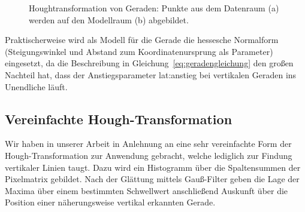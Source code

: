 \begin{figure}[h] %
  \centering  
  \qquad
  \caption{Houghtransformation von Geraden: Punkte aus dem Datenraum (a) werden auf den Modellraum (b) abgebildet.}
\end{figure} 

Praktischerweise wird als Modell für die Gerade die hessesche Normalform (Steigungswinkel und Abstand zum Koordinatenursprung als Parameter) eingesetzt, da die Beschreibung in Gleichung~\ref{eq:geradengleichung} den großen Nachteil hat, dass der Anstiegsparameter \gls{lat:anstieg} bei vertikalen Geraden ins Unendliche läuft. 

\subsection{Vereinfachte Hough-Transformation}
\label{ssec:grundlagen:hough:vereinfachte}
Wir haben in unserer Arbeit in Anlehnung an \autocite{alyRealTimeDetection2008} eine sehr vereinfachte Form der Hough-Transformation zur Anwendung gebracht, welche lediglich zur Findung vertikaler Linien taugt. Dazu wird ein Histogramm über die Spaltensummen der Pixelmatrix gebildet. Nach der Glättung mittels Gauß-Filter geben die Lage der Maxima über einem bestimmten Schwellwert anschließend Auskunft über die Position einer näherungsweise vertikal erkannten Gerade.

